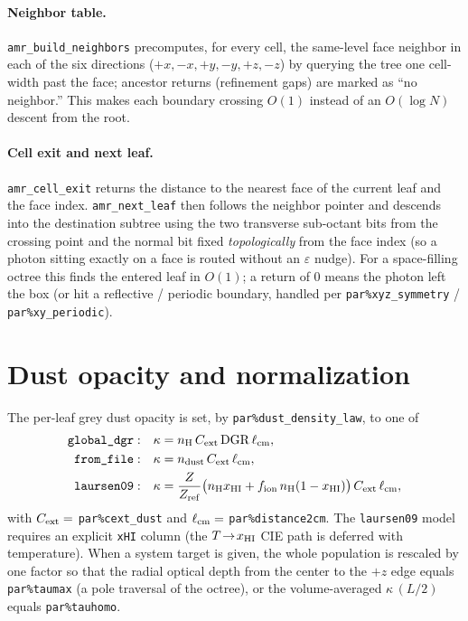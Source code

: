 \documentclass[english,a4paper]{kiseon_memo}
\begin{document}
\paragraph{Neighbor table.}
\texttt{amr\_build\_neighbors} precomputes, for every cell, the same-level
face neighbor in each of the six directions ($+x,-x,+y,-y,+z,-z$) by querying
the tree one cell-width past the face; ancestor returns (refinement gaps) are
marked as ``no neighbor.''  This makes each boundary crossing $O(1)$ instead
of an $O(\log N)$ descent from the root.

\paragraph{Cell exit and next leaf.}
\texttt{amr\_cell\_exit} returns the distance to the nearest face of the
current leaf and the face index.  \texttt{amr\_next\_leaf} then follows the
neighbor pointer and descends into the destination subtree using the two
transverse sub-octant bits from the crossing point and the normal bit fixed
\emph{topologically} from the face index (so a photon sitting exactly on a
face is routed without an $\varepsilon$ nudge).  For a space-filling octree
this finds the entered leaf in $O(1)$; a return of $0$ means the photon left
the box (or hit a reflective / periodic boundary, handled per
\texttt{par\%xyz\_symmetry} / \texttt{par\%xy\_periodic}).

\section{Dust opacity and normalization}
The per-leaf grey dust opacity is set, by \texttt{par\%dust\_density\_law}, to one of
\begin{align}
  \texttt{global\_dgr}:&\quad \kappa = n_{\rm H}\,C_{\rm ext}\,\mathrm{DGR}\,\ell_{\rm cm}, \\
  \texttt{from\_file}:&\quad \kappa = n_{\rm dust}\,C_{\rm ext}\,\ell_{\rm cm}, \\
  \texttt{laursen09}:&\quad \kappa = \frac{Z}{Z_{\rm ref}}\big(n_{\rm H}x_{\rm HI}
       + f_{\rm ion}\,n_{\rm H}(1-x_{\rm HI})\big)\,C_{\rm ext}\,\ell_{\rm cm},
\end{align}
with $C_{\rm ext}=$ \texttt{par\%cext\_dust} and $\ell_{\rm cm}=$
\texttt{par\%distance2cm}.  The \texttt{laursen09} model requires an explicit
\texttt{xHI} column (the $T\!\to\!x_{\rm HI}$ CIE path is deferred with
temperature).  When a system target is given, the whole population is rescaled
by one factor so that the radial optical depth from the center to the $+z$
edge equals \texttt{par\%taumax} (a pole traversal of the octree), or the
volume-averaged $\kappa\,(L/2)$ equals \texttt{par\%tauhomo}.
\end{document}
